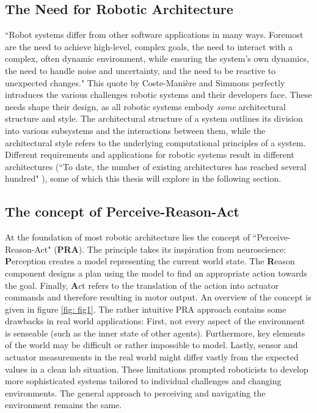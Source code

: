 \documentclass[%
paper=A4,               %
twoside=true,           %
openright,              %
11pt,                   %
bibliography=totoc,     %
titlepage=on,           %
DIV=12,                 %
BCOR=1.5cm,             %
parskip=half,            %
final
]{scrreprt}
\begin{document}
	\subsection{The Need for Robotic Architecture}
	``Robot systems differ from other software applications in many ways. Foremost are the need to achieve high-level, complex goals, the need to interact with a complex, often dynamic environment, while ensuring the system’s own dynamics, the need to handle noise and uncertainty, and the need to be reactive to unexpected changes." \autocite{coste-maniereArchitectureBackboneRobotic2000} This quote by Coste-Mani\`{e}re and Simmons perfectly introduces the various challenges robotic systems and their developers face. These needs shape their design, as all robotic systems embody \textit{some} architectural structure and style. The architectural structure of a system outlines its division into various subsystems and the interactions between them, while the architectural style refers to the underlying computational principles of a system. \autocite{coste-maniereArchitectureBackboneRobotic2000} Different requirements and applications for robotic systems result in different architectures (``To date, the number of existing architectures has reached several hundred" \autocite{kotseruba40YearsCognitive2020}), some of which this thesis will explore in the following section.
	
	\subsection{The concept of Perceive-Reason-Act}
	At the foundation of most robotic architecture lies the concept of ``Perceive-Reason-Act" (\textbf{PRA}).
	The principle takes its inspiration from neuroscience: \textbf{P}erception creates a model representing the current world state. The \textbf{R}eason component designs a plan using the model to find an appropriate action towards the goal. Finally, \textbf{A}ct refers to the translation of the action into actuator commands and therefore resulting in motor output. \autocite{schillingAutonomeSystemeUnd2023} An overview of the concept is given in figure \ref{fig: fig1}. The rather intuitive PRA approach contains some drawbacks in real world applications: First, not every aspect of the environment is senseable (such as the inner state of other agents). Furthermore, key elements of the world may be difficult or rather impossible to model. Lastly, sensor and actuator measurements in the real world might differ vastly from the expected values in a clean lab situation. \autocite{schillingAutonomeSystemeUnd2023} These limitations prompted roboticists to develop more sophisticated systems tailored to individual challenges and changing environments. The general approach to perceiving and navigating the environment remains the same.
	
\end{document}
